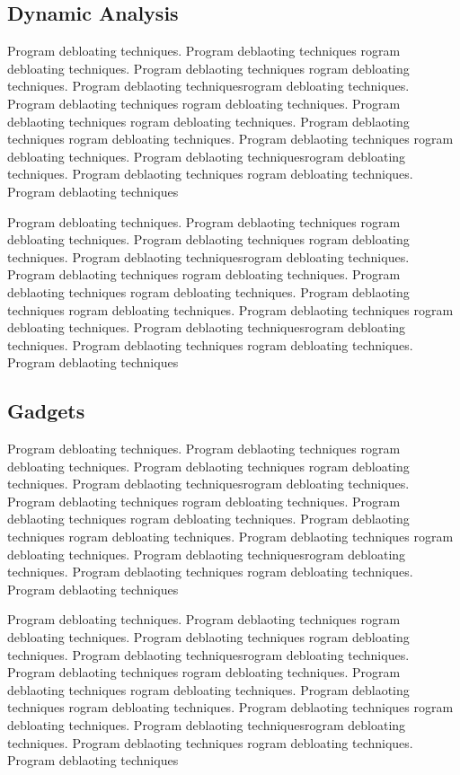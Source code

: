 \documentclass{relatorio}
\begin{document}
\subsection{Dynamic Analysis}%
\label{Tools}

Program debloating techniques. Program deblaoting techniques rogram debloating techniques. Program deblaoting techniques
rogram debloating techniques. Program deblaoting techniquesrogram debloating techniques. Program deblaoting techniques
rogram debloating techniques. Program deblaoting techniques rogram debloating techniques. Program deblaoting techniques
rogram debloating techniques. Program deblaoting techniques 
rogram debloating techniques. Program deblaoting techniquesrogram debloating techniques. Program deblaoting techniques
rogram debloating techniques. Program deblaoting techniques

Program debloating techniques. Program deblaoting techniques rogram debloating techniques. Program deblaoting techniques
rogram debloating techniques. Program deblaoting techniquesrogram debloating techniques. Program deblaoting techniques
rogram debloating techniques. Program deblaoting techniques rogram debloating techniques. Program deblaoting techniques
rogram debloating techniques. Program deblaoting techniques 
rogram debloating techniques. Program deblaoting techniquesrogram debloating techniques. Program deblaoting techniques
rogram debloating techniques. Program deblaoting techniques

\subsection{Gadgets}%
\label{Tools}

Program debloating techniques. Program deblaoting techniques rogram debloating techniques. Program deblaoting techniques
rogram debloating techniques. Program deblaoting techniquesrogram debloating techniques. Program deblaoting techniques
rogram debloating techniques. Program deblaoting techniques rogram debloating techniques. Program deblaoting techniques
rogram debloating techniques. Program deblaoting techniques 
rogram debloating techniques. Program deblaoting techniquesrogram debloating techniques. Program deblaoting techniques
rogram debloating techniques. Program deblaoting techniques

Program debloating techniques. Program deblaoting techniques rogram debloating techniques. Program deblaoting techniques
rogram debloating techniques. Program deblaoting techniquesrogram debloating techniques. Program deblaoting techniques
rogram debloating techniques. Program deblaoting techniques rogram debloating techniques. Program deblaoting techniques
rogram debloating techniques. Program deblaoting techniques 
rogram debloating techniques. Program deblaoting techniquesrogram debloating techniques. Program deblaoting techniques
rogram debloating techniques. Program deblaoting techniques
\end{document}
